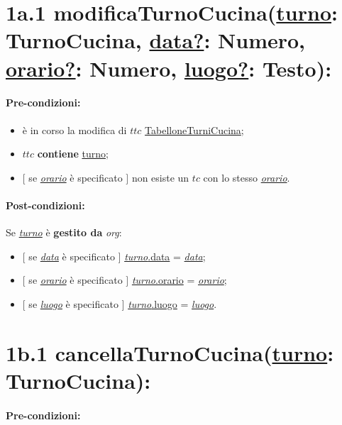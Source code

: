 \section*{1a.1 modificaTurnoCucina(\underline{turno}: TurnoCucina, \underline{data?}: Numero, \underline{orario?}: Numero, \underline{luogo?}: Testo):}

\paragraph{Pre-condizioni:}

\begin{itemize}
 \item è in corso la modifica di $ttc$ \underline{TabelloneTurniCucina};
 \item $ttc$ \textbf{contiene} \underline{turno};
 \item $[$ se \underline{\textit{orario}} è specificato $]$ non esiste un $tc$ con lo stesso \underline{\textit{orario}}.
\end{itemize}

\paragraph{Post-condizioni:} Se \underline{\textit{turno}} è \textbf{gestito da} \textit{org}:

\begin{itemize}
    \item $[$ se \underline{\textit{data}} è specificato $]$ \underline{\textit{turno}.data} = \underline{\textit{data}};

    \item $[$ se \underline{\textit{orario}} è specificato $]$ \underline{\textit{turno}.orario} = \underline{\textit{orario}};

    \item $[$ se \underline{\textit{luogo}} è specificato $]$ \underline{\textit{turno}.luogo} = \underline{\textit{luogo}}.

\end{itemize}

\section*{1b.1 cancellaTurnoCucina(\underline{turno}: TurnoCucina):}

\paragraph{Pre-condizioni:}

